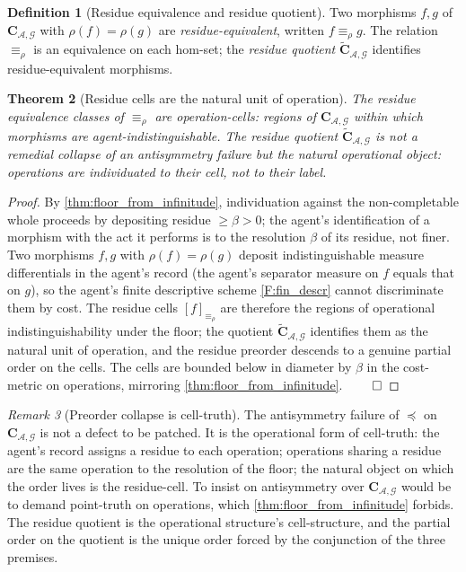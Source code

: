 \documentclass[11pt,a4paper]{article}
\theoremstyle{thmstyle}
\newtheorem{theorem}{Theorem}[section]
\theoremstyle{definition}
\newtheorem{definition}[theorem]{Definition}
\theoremstyle{remark}
\newtheorem{remark}[theorem]{Remark}
\newcommand{\Graph}{\mathcal{G}}
\newcommand{\Agent}{\mathcal{A}}
\newcommand{\Res}{\rho}
\newcommand{\floor}{\beta}
\begin{document}
\begin{definition}[Residue equivalence and residue quotient]
\label{def:residue_equiv}
Two morphisms $f, g$ of $\mathbf{C}_{\Agent,\Graph}$ with
$\Res(f) = \Res(g)$ are \emph{residue-equivalent}, written
$f \equiv_\Res g$. The relation $\equiv_\Res$ is an equivalence on
each hom-set; the \emph{residue quotient}
$\widetilde{\mathbf{C}}_{\Agent,\Graph}$ identifies
residue-equivalent morphisms.
\end{definition}

\begin{theorem}[Residue cells are the natural unit of operation]
\label{thm:residue_cells}
The residue equivalence classes of $\equiv_\Res$ are
\emph{operation-cells}: regions of $\mathbf{C}_{\Agent,\Graph}$
within which morphisms are agent-indistinguishable. The residue
quotient $\widetilde{\mathbf{C}}_{\Agent,\Graph}$ is not a
remedial collapse of an antisymmetry failure but the natural
operational object: operations are individuated to their cell, not
to their label.
\end{theorem}

\begin{proof}
By \cref{thm:floor_from_infinitude}, individuation against the
non-completable whole proceeds by depositing residue
$\geq \floor > 0$; the agent's identification of a morphism with the
act it performs is to the resolution $\floor$ of its residue, not
finer. Two morphisms $f, g$ with $\Res(f) = \Res(g)$ deposit
indistinguishable measure differentials in the agent's record (the
agent's separator measure on $f$ equals that on $g$), so the
agent's finite descriptive scheme \ref{F:fin_descr} cannot
discriminate them by cost. The residue cells $[f]_{\equiv_\Res}$
are therefore the regions of operational indistinguishability under
the floor; the quotient
$\widetilde{\mathbf{C}}_{\Agent,\Graph}$ identifies them as the
natural unit of operation, and the residue preorder descends to a
genuine partial order on the cells. The cells are bounded below in
diameter by $\floor$ in the cost-metric on operations, mirroring
\cref{thm:floor_from_infinitude}. $\qed$
\end{proof}

\begin{remark}[Preorder collapse is cell-truth]
\label{rem:preorder_cell_truth}
The antisymmetry failure of $\preceq$ on $\mathbf{C}_{\Agent,
\Graph}$ is not a defect to be patched. It is the operational form
of cell-truth: the agent's record assigns a residue to each
operation; operations sharing a residue are the same operation to
the resolution of the floor; the natural object on which the order
lives is the residue-cell. To insist on antisymmetry over
$\mathbf{C}_{\Agent,\Graph}$ would be to demand point-truth on
operations, which \cref{thm:floor_from_infinitude} forbids. The
residue quotient is the operational structure's cell-structure, and
the partial order on the quotient is the unique order forced by
the conjunction of the three premises.
\end{remark}
\end{document}
